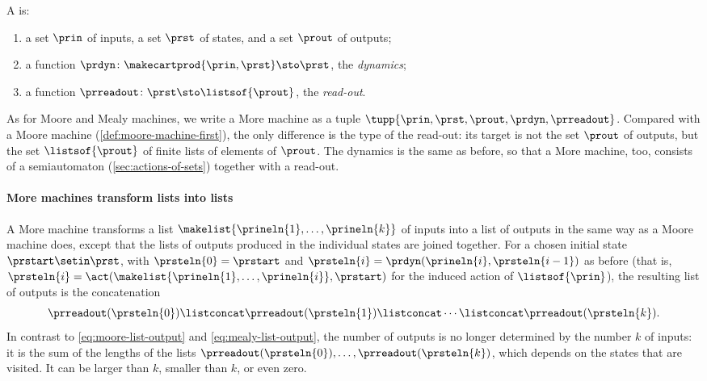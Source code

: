 \begin{ctdefinition}
    \label{def:more-machine-first}
    A  is:

    \constit
    \begin{enumerate}
        \item a set $\prin$ of inputs, a set $\prst$ of states, and a set $\prout$ of outputs;
        \item a function $\prdyn \colon \makecartprod{\prin, \prst} \sto \prst$, the \emph{dynamics};
        \item a function $\prreadout \colon \prst \sto \listsof{\prout}$, the \emph{read-out}.
    \end{enumerate}
\end{ctdefinition}

As for Moore and Mealy machines, we write a More machine as a tuple $\tupp{\prin,\prst,\prout,\prdyn,\prreadout}$.
Compared with a Moore machine (\cref{def:moore-machine-first}), the only difference is the type of the read-out: its target is not the set $\prout$ of outputs, but the set $\listsof{\prout}$ of finite lists of elements of $\prout$.
The dynamics is the same as before, so that a More machine, too, consists of a semiautomaton (\cref{sec:actions-of-sets}) together with a read-out.

\paragraph{More machines transform lists into lists}
A More machine transforms a list $\makelist{\prineln{1}, \dots, \prineln{k}}$ of inputs into a list of outputs in the same way as a Moore machine does, except that the lists of outputs produced in the individual states are joined together.
For a chosen initial state $\prstart \setin \prst$, with $\prsteln{0} = \prstart$ and $\prsteln{i} = \prdyn(\prineln{i}, \prsteln{i-1})$ as before (that is, $\prsteln{i} = \act(\makelist{\prineln{1}, \dots, \prineln{i}}, \prstart)$ for the induced action of $\listsof{\prin}$), the resulting list of outputs is the concatenation
\begin{equation}
    \label{eq:more-list-output}
    \prreadout(\prsteln{0}) \listconcat \prreadout(\prsteln{1}) \listconcat \cdots \listconcat \prreadout(\prsteln{k}).
\end{equation}
In contrast to \cref{eq:moore-list-output} and \cref{eq:mealy-list-output}, the number of outputs is no longer determined by the number $k$ of inputs: it is the sum of the lengths of the lists $\prreadout(\prsteln{0}), \dots, \prreadout(\prsteln{k})$, which depends on the states that are visited.
It can be larger than $k$, smaller than $k$, or even zero.

